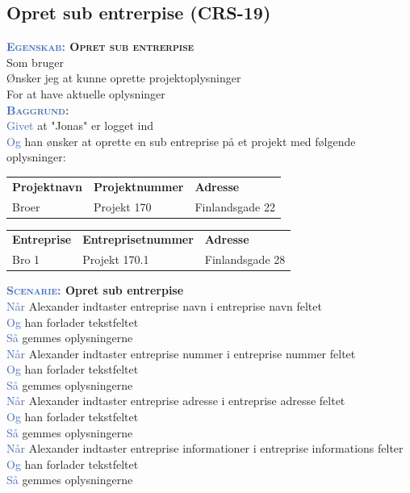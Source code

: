 \subsection{Opret sub entrerpise (CRS-19)} \label{sec:USOpretSubEntreprise}
\textbf{\textsc{\textcolor{RoyalBlue}{Egenskab:} Opret sub entrerpise}}\\
Som bruger\\
Ønsker jeg at kunne oprette projektoplysninger\\
For at have aktuelle oplysninger \\

\textsc{\textcolor{RoyalBlue}{\textbf{Baggrund:}}}\\
\textcolor{RoyalBlue}{Givet} at "Jonas" er logget ind\\
\textcolor{RoyalBlue}{Og} han ønsker at oprette en sub entreprise på et projekt med følgende oplysninger:\\
\begin{tabular}{| l | l | l |}
	\textbf{Projektnavn} & \textbf{Projektnummer} & \textbf{Adresse} \\
	Broer & Projekt 170 & Finlandsgade 22 \\
\end{tabular}
\newline \newline

\begin{tabular}{| l | l | l |}
	\textbf{Entreprise} & \textbf{Entreprisetnummer} & \textbf{Adresse} \\
	Bro 1 & Projekt 170.1 & Finlandsgade 28 \\
\end{tabular}
\newline \newline

\textbf{\textsc{\textcolor{RoyalBlue}{Scenarie:}} Opret sub entrerpise}\\
\textcolor{RoyalBlue}{Når} Alexander indtaster entreprise navn i entreprise navn feltet\\
\textcolor{RoyalBlue}{Og} han forlader tekstfeltet\\
\textcolor{RoyalBlue}{Så} gemmes oplysningerne\\
\textcolor{RoyalBlue}{Når} Alexander indtaster entreprise nummer i entreprise nummer feltet\\
\textcolor{RoyalBlue}{Og} han forlader tekstfeltet\\
\textcolor{RoyalBlue}{Så} gemmes oplysningerne\\
\textcolor{RoyalBlue}{Når} Alexander indtaster entreprise adresse i entreprise adresse feltet\\
\textcolor{RoyalBlue}{Og} han forlader tekstfeltet\\
\textcolor{RoyalBlue}{Så} gemmes oplysningerne\\
\textcolor{RoyalBlue}{Når} Alexander indtaster entreprise informationer i entreprise informations felter\\
\textcolor{RoyalBlue}{Og} han forlader tekstfeltet\\
\textcolor{RoyalBlue}{Så} gemmes oplysningerne\\
